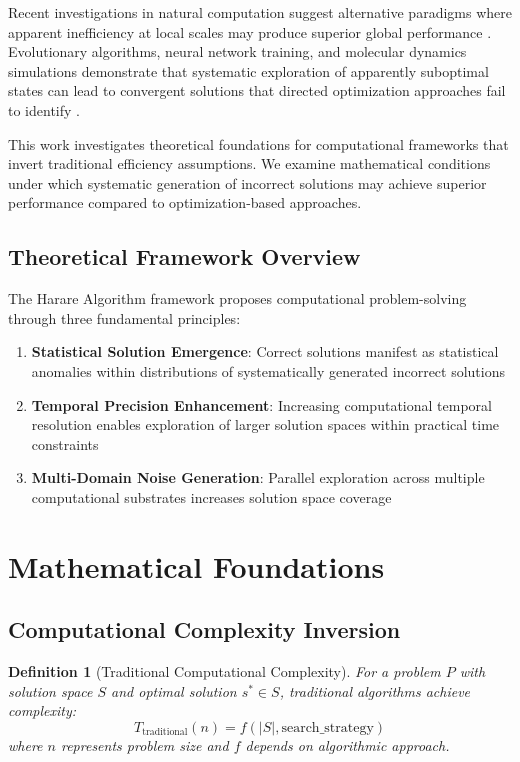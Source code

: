 \documentclass[11pt,a4paper]{article}
\newtheorem{definition}[theorem]{Definition}
\theoremstyle{remark}
\begin{document}
Recent investigations in natural computation suggest alternative paradigms where apparent inefficiency at local scales may produce superior global performance \cite{holland1992adaptation,mitchell1998introduction}. Evolutionary algorithms, neural network training, and molecular dynamics simulations demonstrate that systematic exploration of apparently suboptimal states can lead to convergent solutions that directed optimization approaches fail to identify \cite{goldberg1989genetic,rumelhart1986learning}.

This work investigates theoretical foundations for computational frameworks that invert traditional efficiency assumptions. We examine mathematical conditions under which systematic generation of incorrect solutions may achieve superior performance compared to optimization-based approaches.

\subsection{Theoretical Framework Overview}

The Harare Algorithm framework proposes computational problem-solving through three fundamental principles:

\begin{enumerate}
\item \textbf{Statistical Solution Emergence}: Correct solutions manifest as statistical anomalies within distributions of systematically generated incorrect solutions
\item \textbf{Temporal Precision Enhancement}: Increasing computational temporal resolution enables exploration of larger solution spaces within practical time constraints
\item \textbf{Multi-Domain Noise Generation}: Parallel exploration across multiple computational substrates increases solution space coverage
\end{enumerate}

\section{Mathematical Foundations}

\subsection{Computational Complexity Inversion}

\begin{definition}[Traditional Computational Complexity]
For a problem $P$ with solution space $S$ and optimal solution $s^* \in S$, traditional algorithms achieve complexity:
$$T_{\text{traditional}}(n) = f(|S|, \text{search\_strategy})$$
where $n$ represents problem size and $f$ depends on algorithmic approach.
\end{definition}
\end{document}
